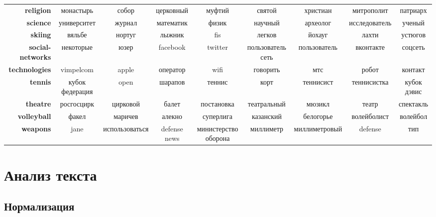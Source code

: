 \documentclass[a4paper, 14pt]{extarticle}
\begin{document}
\begin{table}[h]
{\begin{tabular}{r|cccccccc}
			\textbf{religion}        &          монастырь &           собор &          церковный &                муфтий &                святой &       христиан &       митрополит &        патриарх \\
			\textbf{science}         &        университет &          журнал &          математик &                 физик &               научный &       археолог &    исследователь &          ученый \\
			\textbf{skiing}          &             вяльбе &          нортуг &             лыжник &                   fis &                легков &         йохауг &            лахти &         устюгов \\
			\textbf{social-networks} &          некоторые &            юзер &           facebook &               twitter &     пользователь сеть &   пользователь &        вконтакте &         соцсеть \\
			\textbf{technologies}    &          vimpelcom &           apple &           оператор &                  wifi &              говорить &            мтс &            робот &         контакт \\
			\textbf{tennis}          &    кубок федерация &            open &            шарапов &                теннис &                  корт &      теннисист &      теннисистка &     кубок дэвис \\
			\textbf{theatre}         &         росгосцирк &        цирковой &              балет &            постановка &           театральный &         мюзикл &            театр &       спектакль \\
			\textbf{volleyball}      &              факел &         маричев &             алекно &             суперлига &             казанский &      белогорье &      волейболист &        волейбол \\
			\textbf{weapons}         &               jane &  использоваться &       defense news &  министерство оборона &             миллиметр &  миллиметровый &          defense &             тип \\
		\end{tabular}
		}
	\label{word_feachers}
\end{table}


\section{Анализ текста}
\subsection{Нормализация}
\end{document}
